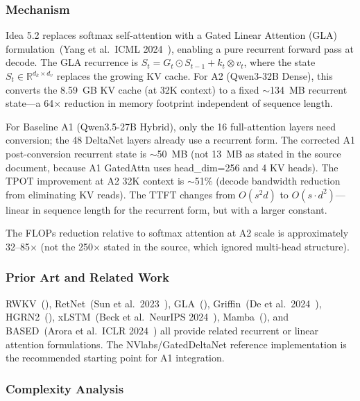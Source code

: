 \documentclass[11pt]{article}
\begin{document}
\subsubsection*{Mechanism}

Idea 5.2 replaces softmax self-attention with a Gated Linear Attention (GLA) formulation~(Yang et al.\ ICML 2024~\cite{YangGLA2024}), enabling a pure recurrent forward pass at decode. The GLA recurrence is $S_t = G_t \odot S_{t-1} + k_t \otimes v_t$, where the state $S_t \in \mathbb{R}^{d_k \times d_v}$ replaces the growing KV cache. For A2 (Qwen3-32B Dense), this converts the 8.59~GB KV cache (at 32K context) to a fixed $\sim$134~MB recurrent state---a 64$\times$ reduction in memory footprint independent of sequence length.

For Baseline A1 (Qwen3.5-27B Hybrid), only the 16 full-attention layers need conversion; the 48 DeltaNet layers already use a recurrent form. The corrected A1 post-conversion recurrent state is $\sim$50~MB (not 13~MB as stated in the source document, because A1 GatedAttn uses head\_dim=256 and 4 KV heads). The TPOT improvement at A2 32K context is $\sim$51\% (decode bandwidth reduction from eliminating KV reads). The TTFT changes from $O(s^2 d)$ to $O(s \cdot d^2)$---linear in sequence length for the recurrent form, but with a larger constant.

The FLOPs reduction relative to softmax attention at A2 scale is approximately 32--85$\times$ (not the 250$\times$ stated in the source, which ignored multi-head structure).

\subsubsection*{Prior Art and Related Work}

RWKV~(\cite{PengRWKV2023}), RetNet~(Sun et al.\ 2023~\cite{SunRetNet2023}), GLA~(\cite{YangGLA2024}), Griffin~(De et al.\ 2024~\cite{DeGriffin2024}), HGRN2~(\cite{HGRN2024}), xLSTM~(Beck et al.\ NeurIPS 2024~\cite{BeckXLSTM2024}), Mamba~(\cite{GudMamba2023}), and BASED~(Arora et al.\ ICLR 2024~\cite{AroraBASED2024}) all provide related recurrent or linear attention formulations. The NVlabs/GatedDeltaNet reference implementation is the recommended starting point for A1 integration.

\subsubsection*{Complexity Analysis}
\end{document}
